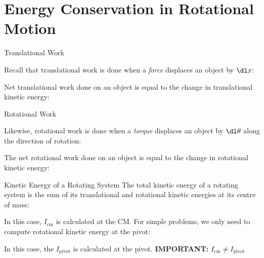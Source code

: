 \documentclass[12pt,compress,aspectratio=169]{beamer}
\begin{document}
\section{Energy Conservation in Rotational Motion}

\begin{frame}{Translational Work}

  Recall that translational work is done when a \emph{force} displaces an
  object by $\dl x$:


  Net translational work done on an object is equal to the change in
  translational kinetic energy:


\end{frame}



\begin{frame}{Rotational Work}

  Likewise, rotational work is done when a \emph{torque} displaces an object by
  $\dl\theta$ along the direction of rotation:


  The net rotational work done on an object
  is equal to the change in rotational kinetic energy:

\end{frame}



\begin{frame}{Kinetic Energy of a Rotating System}
  The total kinetic energy of a rotating system is the sum of its translational
  and rotational kinetic energies at its centre of mass:

  
  In this case, $I_\text{cm}$ is calculated at the CM. For simple
  problems, we only need to compute rotational kinetic energy at the pivot:
  
  
  In this case, the $I_\text{pivot}$ is calculated at the pivot.
  \textbf{IMPORTANT:} $I_\text{cm}\neq I_\text{pivot}$
\end{frame}
\end{document}
